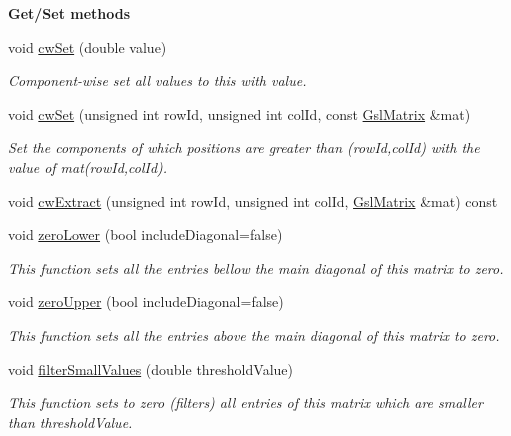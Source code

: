 \begin{Indent}{\bf Get/\-Set methods}\par
\begin{DoxyCompactItemize}
\item 
void \hyperlink{class_q_u_e_s_o_1_1_gsl_matrix_a0456a2b3d53081597d51cc5668c4336d}{cw\-Set} (double value)
\begin{DoxyCompactList}\small\item\em Component-\/wise set all values to {\ttfamily this} with value. \end{DoxyCompactList}\item 
void \hyperlink{class_q_u_e_s_o_1_1_gsl_matrix_a820e4d7c9022bf1daacb3ce1d1c1e9f5}{cw\-Set} (unsigned int row\-Id, unsigned int col\-Id, const \hyperlink{class_q_u_e_s_o_1_1_gsl_matrix}{Gsl\-Matrix} \&mat)
\begin{DoxyCompactList}\small\item\em Set the components of {\ttfamily which} positions are greater than (row\-Id,col\-Id) with the value of mat(row\-Id,col\-Id). \end{DoxyCompactList}\item 
void \hyperlink{class_q_u_e_s_o_1_1_gsl_matrix_ab02526ac204bf3d996151f7268404f0c}{cw\-Extract} (unsigned int row\-Id, unsigned int col\-Id, \hyperlink{class_q_u_e_s_o_1_1_gsl_matrix}{Gsl\-Matrix} \&mat) const 
\item 
void \hyperlink{class_q_u_e_s_o_1_1_gsl_matrix_a16df37ab8ed83c20524bc846307af3da}{zero\-Lower} (bool include\-Diagonal=false)
\begin{DoxyCompactList}\small\item\em This function sets all the entries bellow the main diagonal of {\ttfamily this} matrix to zero. \end{DoxyCompactList}\item 
void \hyperlink{class_q_u_e_s_o_1_1_gsl_matrix_a339544c96dcdc176cc629fc326762832}{zero\-Upper} (bool include\-Diagonal=false)
\begin{DoxyCompactList}\small\item\em This function sets all the entries above the main diagonal of {\ttfamily this} matrix to zero. \end{DoxyCompactList}\item 
void \hyperlink{class_q_u_e_s_o_1_1_gsl_matrix_af2bb35fbe48b5313002e472f8d1dbe03}{filter\-Small\-Values} (double threshold\-Value)
\begin{DoxyCompactList}\small\item\em This function sets to zero (filters) all entries of {\ttfamily this} matrix which are smaller than {\ttfamily threshold\-Value}. \end{DoxyCompactList}\item 

\end{DoxyCompactItemize}
\end{Indent}
